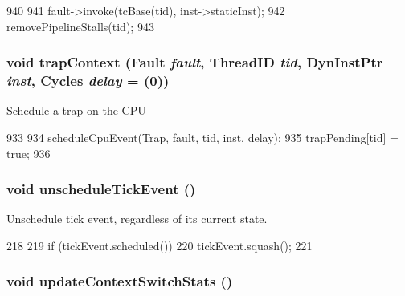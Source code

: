 \begin{DoxyCode}
940 {
941     fault->invoke(tcBase(tid), inst->staticInst);
942     removePipelineStalls(tid);
943 }
\end{DoxyCode}
\hypertarget{classInOrderCPU_a89e3462bf1fe289c9196b20b1d4a907e}{
\subsubsection[{trapContext}]{\setlength{\rightskip}{0pt plus 5cm}void trapContext ({\bf Fault} {\em fault}, \/  {\bf ThreadID} {\em tid}, \/  {\bf DynInstPtr} {\em inst}, \/  {\bf Cycles} {\em delay} = {(0)})}}
\label{classInOrderCPU_a89e3462bf1fe289c9196b20b1d4a907e}
Schedule a trap on the CPU 


\begin{DoxyCode}
933 {
934     scheduleCpuEvent(Trap, fault, tid, inst, delay);
935     trapPending[tid] = true;
936 }
\end{DoxyCode}
\hypertarget{classInOrderCPU_ad819e7898bd94721d107a35fde764390}{
\subsubsection[{unscheduleTickEvent}]{\setlength{\rightskip}{0pt plus 5cm}void unscheduleTickEvent ()}}
\label{classInOrderCPU_ad819e7898bd94721d107a35fde764390}
Unschedule tick event, regardless of its current state. 


\begin{DoxyCode}
218     {
219         if (tickEvent.scheduled())
220             tickEvent.squash();
221     }
\end{DoxyCode}
\hypertarget{classInOrderCPU_a18e33751f284bf73d45d25224e93e6a0}{
\subsubsection[{updateContextSwitchStats}]{\setlength{\rightskip}{0pt plus 5cm}void updateContextSwitchStats ()}}
\label{classInOrderCPU_a18e33751f284bf73d45d25224e93e6a0}



